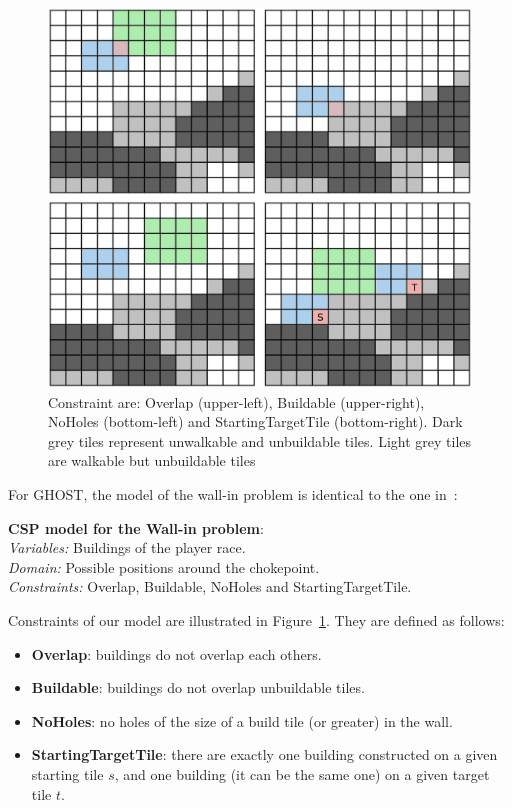 \documentclass[journal]{IEEEtran}
\newcommand{\ghost}{\textsc{GHOST}\xspace}
\newcommand{\modelcsp}[4]%
{ \begin{trivlist}
  \item[]%
    \textbf{CSP model for #1}:\\
    \textit{Variables:} #2\\
    \textit{Domain:} #3\\
    \textit{Constraints:} #4
  \end{trivlist}%
}
\begin{document}
\begin{figure}[htb]
  \centering
  \includegraphics[width=\columnwidth]{figs/all_constraints.png}
  \caption{Constraint    are:    Overlap    (upper-left),    Buildable
    (upper-right),   NoHoles   (bottom-left)  and   StartingTargetTile
    (bottom-right).    Dark  grey   tiles  represent   unwalkable  and
    unbuildable tiles.  Light grey  tiles are walkable but unbuildable
    tiles}
  \label{fig:wall_constraint}
\end{figure}

For \ghost, the  model of the wall-in problem is  identical to the one
in~\cite{RichouxUO14}:
\modelcsp{the Wall-in problem}%
{Buildings of the player race.}%
{Possible positions around the chokepoint.}%
{Overlap, Buildable, NoHoles and StartingTargetTile.}

Constraints     of      our     model     are      illustrated     in
Figure~\ref{fig:wall_constraint}. They are defined as follows:
\begin{itemize}
\item {\bf Overlap}: buildings do not overlap each others.
\item {\bf Buildable}: buildings do not overlap unbuildable tiles.
\item {\bf NoHoles}: no holes of the size of a build tile (or greater)
  in the wall.
\item  {\bf  StartingTargetTile}:  there   are  exactly  one  building
  constructed on a  given starting tile $s$, and one  building (it can
  be the same one) on a given target tile $t$.
\end{itemize}
\end{document}
